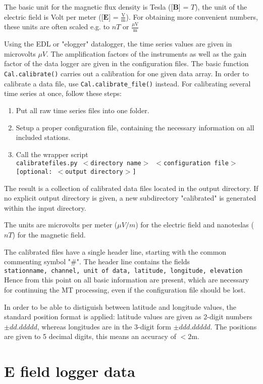 The basic unit for the magnetic flux density is Tesla ([$\mathbf{B}$] = $T$), the unit of the electric field is Volt per meter ([$\mathbf{E}$] = $\frac{\mbox{V}}{\mbox{m}}$). For obtaining more convenient numbers, these units are often scaled e.g. to $nT$ or $\frac{\mu\mbox{V}}{\mbox{m}}$

Using the EDL or "elogger" datalogger, the time series values are given in microvolts $\mu V$. The amplification factors of the instruments as well as the gain factor of the data logger are given in the configuration files.
The basic function \texttt{Cal.calibrate()} carries out a calibration for one given data array. In order to calibrate a data file, use  \texttt{Cal.calibrate\_file()} instead.
For calibrating several time series at once, follow these steps:
\begin{enumerate}
\item Put all raw time series files into one folder.
\item Setup a proper configuration file, containing the necessary information on all included stations.  
\item Call the wrapper script\\
\texttt{calibratefiles.py $<$directory name$>$ $<$configuration file$>$ [optional: $<$output directory$>$] }  
\end{enumerate}
The result is a collection of calibrated data files located in the output directory. 
If no explicit output directory is given, a new subdirectory "calibrated" is generated within the input directory. 

The units are microvolts per meter ($\mu V/m$) for the electric field and nanoteslas ($nT$) for the magnetic field.

The calibrated files have a single header line, starting with the common commenting symbol "\#".
The header line contains the fields\\
\texttt{stationname, channel, unit of data, latitude, longitude, elevation}\\
Hence from this point on all basic information are present, which are necessary for continuing the MT processing, even if the configuration file should be lost. 

In order to be able to distiguish between latitude and longitude values, the standard position format is applied: latitude values are given as  2-digit numbers $\pm dd.ddddd$, whereas longitudes are in the 3-digit form $\pm ddd.ddddd$. The positions are given to 5 decimal digits, this means an accuracy of $< 2$m.



\section{E field logger data}
\label{sec:processing.elogger}
